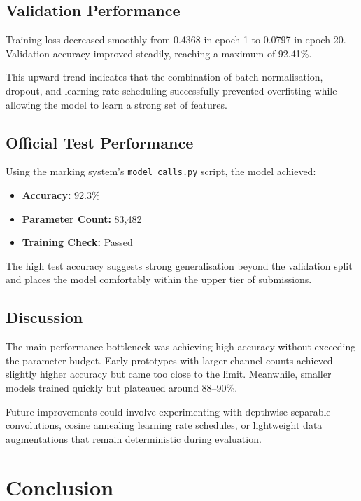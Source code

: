 \documentclass[11pt]{article}
\begin{document}
\subsection{Validation Performance}

Training loss decreased smoothly from 0.4368 in epoch 1 to 0.0797 in epoch 20. Validation accuracy improved steadily, reaching a maximum of 92.41\%.

This upward trend indicates that the combination of batch normalisation, dropout, and learning rate scheduling successfully prevented overfitting while allowing the model to learn a strong set of features.

\subsection{Official Test Performance}

Using the marking system's \texttt{model\_calls.py} script, the model achieved:
\begin{itemize}
    \item \textbf{Accuracy:} 92.3\%
    \item \textbf{Parameter Count:} 83,482
    \item \textbf{Training Check:} Passed
\end{itemize}

The high test accuracy suggests strong generalisation beyond the validation split and places the model comfortably within the upper tier of submissions.

\subsection{Discussion}

The main performance bottleneck was achieving high accuracy without exceeding the parameter budget. Early prototypes with larger channel counts achieved slightly higher accuracy but came too close to the limit. Meanwhile, smaller models trained quickly but plateaued around 88--90\%.

Future improvements could involve experimenting with depthwise-separable convolutions, cosine annealing learning rate schedules, or lightweight data augmentations that remain deterministic during evaluation.

\section{Conclusion}
\end{document}
